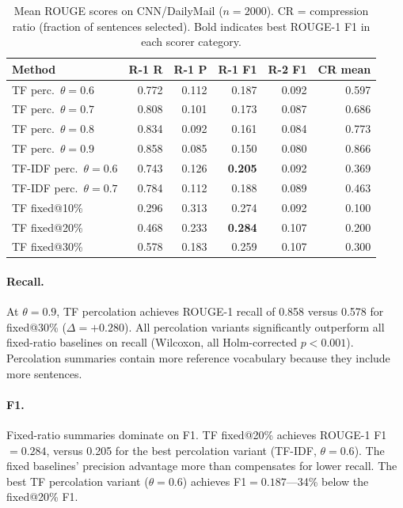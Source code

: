 \documentclass[11pt,letterpaper]{article}
\begin{document}
\begin{table}[!htbp]
  \centering
  \small
  \caption{Mean ROUGE scores on CNN/DailyMail ($n=2000$). CR = compression ratio
    (fraction of sentences selected). Bold indicates best ROUGE-1 F1 in each scorer
    category.}
  \label{tab:cnndm}
  \begin{tabular}{lrrrrr}
    \toprule
    Method & R-1 R & R-1 P & R-1 F1 & R-2 F1 & CR mean \\
    \midrule
    TF perc.\ $\theta{=}0.6$ & 0.772 & 0.112 & 0.187 & 0.092 & 0.597 \\
    TF perc.\ $\theta{=}0.7$ & 0.808 & 0.101 & 0.173 & 0.087 & 0.686 \\
    TF perc.\ $\theta{=}0.8$ & 0.834 & 0.092 & 0.161 & 0.084 & 0.773 \\
    TF perc.\ $\theta{=}0.9$ & 0.858 & 0.085 & 0.150 & 0.080 & 0.866 \\
    TF-IDF perc.\ $\theta{=}0.6$ & 0.743 & 0.126 & \textbf{0.205} & 0.092 & 0.369 \\
    TF-IDF perc.\ $\theta{=}0.7$ & 0.784 & 0.112 & 0.188 & 0.089 & 0.463 \\
    \midrule
    TF fixed@10\% & 0.296 & 0.313 & 0.274 & 0.092 & 0.100 \\
    TF fixed@20\% & 0.468 & 0.233 & \textbf{0.284} & 0.107 & 0.200 \\
    TF fixed@30\% & 0.578 & 0.183 & 0.259 & 0.107 & 0.300 \\
    \bottomrule
  \end{tabular}
\end{table}

\paragraph{Recall.}
At $\theta{=}0.9$, TF percolation achieves ROUGE-1 recall of 0.858 versus 0.578 for
fixed@30\% ($\Delta{=}{+}0.280$). All percolation variants significantly outperform all
fixed-ratio baselines on recall (Wilcoxon, all Holm-corrected $p<0.001$). Percolation
summaries contain more reference vocabulary because they include more sentences.

\paragraph{F1.}
Fixed-ratio summaries dominate on F1. TF fixed@20\% achieves ROUGE-1 F1$=0.284$, versus
0.205 for the best percolation variant (TF-IDF, $\theta{=}0.6$). The fixed baselines'
precision advantage more than compensates for lower recall. The best TF percolation
variant ($\theta{=}0.6$) achieves F1$=0.187$---34\% below the fixed@20\% F1.
\end{document}
